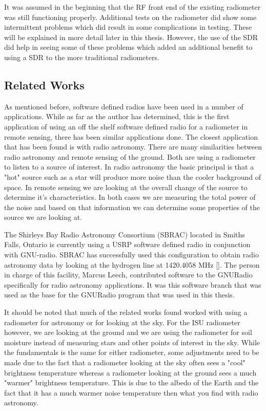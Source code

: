 It was assumed in the beginning that the RF front end of the existing radiometer was still functioning properly.  Additional tests on the radiometer did show some intermittent problems which did result in some complications in testing.  These will be explained in more detail later in this thesis.  However, the use of the SDR did help in seeing some of these problems which added an additional benefit to using a SDR to the more traditional radiometers.  


\subsection{Related Works}
As mentioned before, software defined radios have been used in a number of applications.  While as far as the author has determined, this is the first application of using an off the shelf software defined radio for a radiometer in remote sensing, there has been similar applications done.  The closest application that has been found is with radio astronomy.  There are many similarities between radio astronomy and remote sensing of the ground.  Both are using a radiometer to listen to a source of interest.  In radio astronomy the basic principal is that a "hot" source such as a star will produce more noise than the cooler background of space.  In remote sensing we are looking at the overall change of the source to determine it's characteristics.  In both cases we are measuring the total power of the noise and based on that information we can determine some properties of the source we are looking at.

The Shirleys Bay Radio Astronomy Consortium (SBRAC) located in Smiths Falls, Ontario is currently using a USRP software defined radio in conjunction with GNU-radio.  SBRAC has successfully used this configuration to obtain radio astronomy data by looking at the hydrogen line at 1420.4058 MHz [\cite{Leech2007}].  The person in charge of this facility, Marcus Leech, contributed software to the GNURadio specifically for radio astronomy applications.  It was this software branch that was used as the base for the GNURadio program that was used in this thesis.

It should be noted that much of the related works found worked with using a radiometer for astronomy or for looking at the sky.  For the ISU radiometer however, we are looking at the ground and we are using the radiometer for soil moisture instead of measuring stars and other points of interest in the sky.  While the fundamentals is the same for either radiometer, some adjustments need to be made due to the fact that a radiometer looking at the sky often sees a "cool" brightness temperature whereas a radiometer looking at the ground sees a much "warmer" brightness temperature.  This is due to the albedo of the Earth and the fact that it has a much warmer noise temperature then what you find with radio astronomy.

